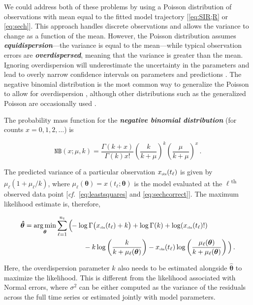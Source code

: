 \documentclass[]{interact}\usepackage[]{graphicx}\usepackage[]{xcolor}
\theoremstyle{plain}%
\theoremstyle{definition}
\theoremstyle{remark}
\newcommand{\term}[1]{{\bfseries\slshape#1}}
\newcommand{\thetavec}{{\bm{\theta}}}
\newcommand{\thetavechat}{{\bm{\hat\theta}}}
\DeclareMathOperator*{\argmin}{arg\,min}
\newcommand{\traj}{x}
\newcommand{\tindex}{{\ell}}
\newcommand{\ti}{t_\tindex}
\newcommand{\tindexmax}{{n_t}}
\newcommand{\trajobssymbol}{\traj_{{\rm{\color{black}\scalebox{0.5}{obs}}}}}
\newcommand{\trajobs}[1]{\trajobssymbol\!\left(#1\right)}
\newcommand{\trajobsti}{\trajobs{\ti}}
\begin{document}
We could address both of these problems by using a
Poisson distribution of observations with mean equal to the fitted
model trajectory [\cref{eq:SIR;R} or \cref{eq:sech}]. This approach handles
discrete observations and allows the variance to change as a function
of the mean. However, the Poisson distribution assumes
\term{equidispersion}---the variance is equal to the mean---while
typical observation errors are \term{overdispersed}, meaning that
the variance is greater than the mean. Ignoring overdispersion
will underestimate the uncertainty in the parameters and lead
to overly narrow confidence intervals on parameters and predictions 
\citep{li2018fitting}.
The negative binomial distribution is the most common way to generalize
the Poisson to allow for overdispersion \citep{linden2011using}, although
other distributions such as the generalized Poisson are occasionally used
\citep{Broo+2019,Kim+2022}.

The probability mass function for the \term{negative binomial
  distribution} (for counts $x=0,1,2,\ldots$) is
\begin{linenomath*}
\begin{equation}\label{eq:NB}
  \texttt{NB}(x;\mu,k) =
  \frac{\Gamma(k+x)}{\Gamma(k) x!}
  \left(\frac{k}{k+\mu}\right)^k
  \left(\frac{\mu}{k+\mu}\right)^x \,.
\end{equation}
\end{linenomath*}
The predicted variance of a particular observation $\trajobsti$ is
given by $\mu_\tindex (1+\mu_\tindex/k)$, where
$\mu_\tindex(\thetavec) = \traj(\ti;\thetavec)$ is the model evaluated
at the $\tindex$\textsuperscript{th} observed data point
[\emph{cf.}\ \eqref{eq:leastsquares} and \eqref{eq:sechcorrect}].  The
maximum likelihood estimate is, therefore,
\begin{linenomath*}
  \begin{equation}
\label{eq:negbinomMLE}
\begin{split}
 \thetavechat
 &= \argmin_\thetavec\sum_{\tindex=1}^{\tindexmax} \Big(\!\!
                -\log\Gamma\big(\trajobsti+k\big)
                +\log\Gamma(k) + \log(\trajobsti!) \\
                &\hspace{3cm}
                -k \log\left(\frac{k}{k+\mu_\tindex(\thetavec)}\right)
                -\trajobsti \log\left(\frac{\mu_\tindex(\thetavec)}{k+\mu_\tindex(\thetavec)}\right)
                \Big)
  \,.
\end{split}
  \end{equation}
\end{linenomath*}
Here, the overdispersion parameter $k$ also needs to be estimated
alongside $\thetavechat$ to maximize the likelihood.
This is different from the likelihood
 associated with Normal errors, where $\sigma^2$ can be either
 computed as the variance of the residuals across the full time
 series or estimated jointly with model parameters.
\end{document}
